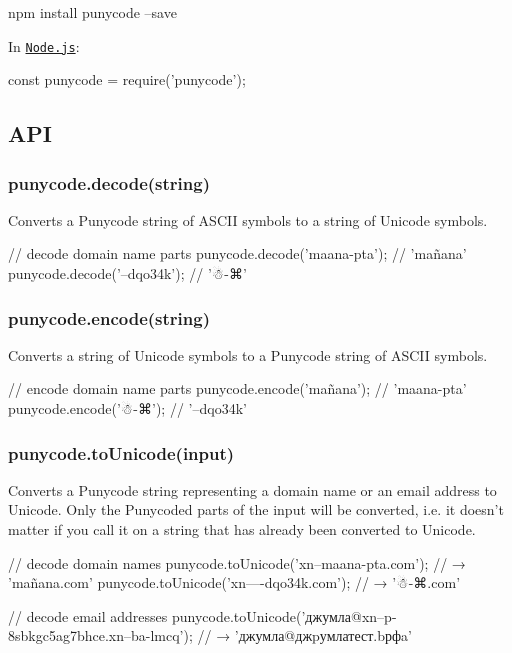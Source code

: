 \begin{DoxyCode}
npm install punycode --save
\end{DoxyCode}


In \href{https://nodejs.org/}{\tt Node.\+js}\+:


\begin{DoxyCode}
const punycode = require('punycode');
\end{DoxyCode}


\subsection*{A\+PI}

\subsubsection*{{\ttfamily punycode.\+decode(string)}}

Converts a Punycode string of A\+S\+C\+II symbols to a string of Unicode symbols.


\begin{DoxyCode}
// decode domain name parts
punycode.decode('maana-pta'); // 'mañana'
punycode.decode('--dqo34k'); // '☃-⌘'
\end{DoxyCode}


\subsubsection*{{\ttfamily punycode.\+encode(string)}}

Converts a string of Unicode symbols to a Punycode string of A\+S\+C\+II symbols.


\begin{DoxyCode}
// encode domain name parts
punycode.encode('mañana'); // 'maana-pta'
punycode.encode('☃-⌘'); // '--dqo34k'
\end{DoxyCode}


\subsubsection*{{\ttfamily punycode.\+to\+Unicode(input)}}

Converts a Punycode string representing a domain name or an email address to Unicode. Only the Punycoded parts of the input will be converted, i.\+e. it doesn’t matter if you call it on a string that has already been converted to Unicode.


\begin{DoxyCode}
// decode domain names
punycode.toUnicode('xn--maana-pta.com');
// → 'mañana.com'
punycode.toUnicode('xn----dqo34k.com');
// → '☃-⌘.com'

// decode email addresses
punycode.toUnicode('джумла@xn--p-8sbkgc5ag7bhce.xn--ba-lmcq');
// → 'джумла@джpумлатест.bрфa'
\end{DoxyCode}


